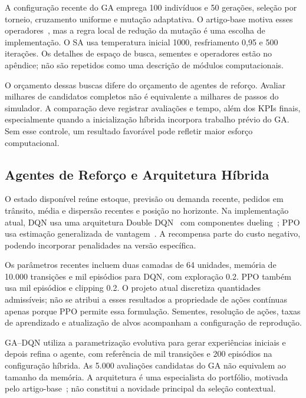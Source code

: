 A configuração recente do GA emprega 100 indivíduos e 50 gerações, seleção por torneio, cruzamento uniforme e mutação adaptativa. O artigo-base motiva esses operadores~\citep{Zabraoui2025GaDQN}, mas a regra local de redução da mutação é uma escolha de implementação. O SA usa temperatura inicial 1000, resfriamento 0,95 e 500 iterações. Os detalhes de espaço de busca, sementes e operadores estão no apêndice; não são repetidos como uma descrição de módulos computacionais.

O orçamento dessas buscas difere do orçamento de agentes de reforço. Avaliar milhares de candidatos completos não é equivalente a milhares de passos do simulador. A comparação deve registrar avaliações e tempo, além dos KPIs finais, especialmente quando a inicialização híbrida incorpora trabalho prévio do GA. Sem esse controle, um resultado favorável pode refletir maior esforço computacional.

\subsection{Agentes de Reforço e Arquitetura Híbrida}

O estado disponível reúne estoque, previsão ou demanda recente, pedidos em trânsito, média e dispersão recentes e posição no horizonte. Na implementação atual, DQN usa uma arquitetura Double DQN~\citep{VanHasselt2016DoubleDQN} com componentes dueling~\citep{Wang2016DuelingDQN}; PPO usa estimação generalizada de vantagem~\citep{Schulman2016GAE}. A recompensa parte do custo negativo, podendo incorporar penalidades na versão específica.

Os parâmetros recentes incluem duas camadas de 64 unidades, memória de 10.000 transições e mil episódios para DQN, com exploração 0.2. PPO também usa mil episódios e clipping 0.2. O projeto atual discretiza quantidades admissíveis; não se atribui a esses resultados a propriedade de ações contínuas apenas porque PPO permite essa formulação. Sementes, resolução de ações, taxas de aprendizado e atualização de alvos acompanham a configuração de reprodução.

GA--DQN utiliza a parametrização evolutiva para gerar experiências iniciais e depois refina o agente, com referência de mil transições e 200 episódios na configuração híbrida. As 5.000 avaliações candidatas do GA não equivalem ao tamanho da memória. A arquitetura é uma especialista do portfólio, motivada pelo artigo-base~\citep{Zabraoui2025GaDQN}; não constitui a novidade principal da seleção contextual.

